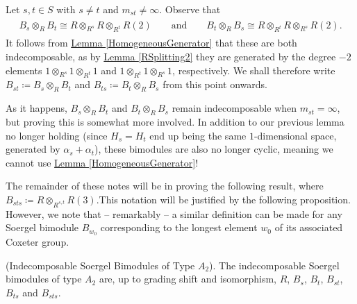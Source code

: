 \noindent Let $s, t \in S$ with $s \neq t$ and $m_{st} \neq \infty$. Observe that
\begin{align*}
\begin{split}
B_s \otimes_R B_t \cong R \otimes_{R^s} R \otimes_{R^t} R(2)\qquad\text{and}\qquad B_t \otimes_R B_s \cong R \otimes_{R^t} R \otimes_{R^s} R(2).
\end{split}
\end{align*}
\noindent It follows from \hyperref[HomogeneousGenerator]{Lemma \ref*{HomogeneousGenerator}} that these are both indecomposable, as by \hyperref[RSplitting2]{Lemma \ref*{RSplitting2}} they are generated by the degree $-2$ elements $1 \otimes_{R^s} 1 \otimes_{R^t} 1$ and $1 \otimes_{R^t} 1 \otimes_{R^s} 1$, respectively. We shall therefore write $B_{st} \coloneqq B_s \otimes_R B_t$ and $B_{ts} \coloneqq B_t \otimes_R B_s$ from this point onwards.\\

\noindent\begin{remark} As it happens, $B_s \otimes_R B_t$ and $B_t \otimes_R B_s$ remain indecomposable when $m_{st} = \infty$, but proving this is somewhat more involved. In addition to our previous lemma no longer holding (since $H_s = H_t$ end up being the same $1$-dimensional space, generated by $\alpha_s + \alpha_t$), these bimodules are also no longer cyclic, meaning we cannot use \hyperref[HomogeneousGenerator]{Lemma \ref*{HomogeneousGenerator}}!\\
\end{remark}

\noindent The remainder of these notes will be in proving the following result, where $B_{sts} \coloneqq R \otimes_{R^{s,t}} R(3)$.\linebreak This notation will be justified by the following proposition. However, we note that -- remarkably -- a similar definition can be made for any Soergel bimodule $B_{w_0}$ corresponding to the longest element $w_0$ of its associated Coxeter group.\newpage

\noindent\begin{proposition}\textup{(Indecomposable Soergel Bimodules of Type $A_2$).} The indecomposable Soergel bimodules of type $A_2$ are, up to grading shift and isomorphism, $R$, $B_s$, $B_t$, $B_{st}$, $B_{ts}$ and $B_{sts}$.\\
\end{proposition}

